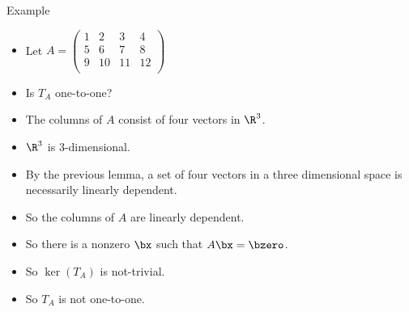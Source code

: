 \documentclass{beamer}
\begin{document}
\begin{frame}{Example}

\begin{itemize}
\item Let $A=
\begin{pmatrix}
1 & 2 & 3 & 4 \\
5 & 6 & 7 & 8 \\
9 & 10 & 11 & 12\\
\end{pmatrix}
$
\item Is $T_A$ one-to-one?
\item The columns of $A$ consist of four vectors in $\R^3$.
\item $\R^3$ is 3-dimensional.
\item By the previous lemma, a set of four vectors in a three dimensional space is necessarily linearly dependent.
\item So the columns of $A$ are linearly dependent.
\item So there is a nonzero $\bx$ such that $A\bx=\bzero$.
\item So $\ker(T_A)$ is not-trivial.
\item So $T_A$ is not one-to-one.
\end{itemize}

\end{frame}
\end{document}
